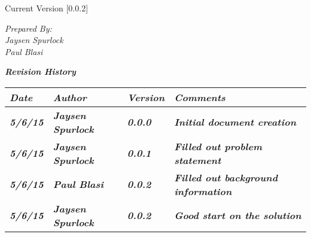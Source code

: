
Current Version [0.0.2]
\vspace*{5mm}

{\color{MSBlue3}
\noindent
\textit{Prepared By:}\\
\textit{Jaysen Spurlock}\\
\textit{Paul Blasi}
}

\newcommand{\revision}[4]
{
    \textit{\textbf{#1}}
    & \textit{\textbf{#2}}
    & \textit{\textbf{#3}}
    & \textit{\textbf{#4}}
    \tabularnewline\hline
}

\vfill
\noindent
{\color{color02} \textit{\textbf{Revision History}}}\\
\begin{tabular}{|>{\raggedright}p{1.5cm}
                |>{\raggedright}p{3cm}
                |>{\raggedright}p{1.5cm}
                |>{\raggedright}p{9cm}
                |}
\hline

\revision{Date}{Author}{Version}{Comments}
\revision{5/6/15}{Jaysen Spurlock}{0.0.0}{Initial document creation}
\revision{5/6/15}{Jaysen Spurlock}{0.0.1}{Filled out problem statement}
\revision{5/6/15}{Paul Blasi}{0.0.2}{Filled out background information}
\revision{5/6/15}{Jaysen Spurlock}{0.0.2}{Good start on the solution}
\end{tabular}
\vfill
